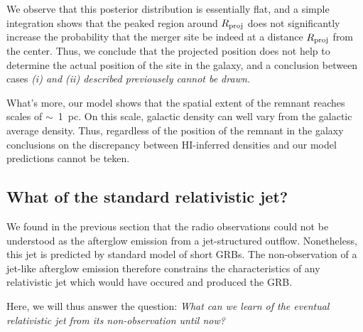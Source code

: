 
We observe that this posterior distribution is essentially flat, and a simple integration shows that the peaked region around $R_\rm{proj}$ does not significantly increase the probability that the merger site be indeed at a distance $R_\rm{proj}$ from the center. Thus, we conclude that the projected position does not help to determine the actual position of the site in the galaxy, and a conclusion between cases \it{(i)} and \it{(ii)} described previousely cannot be drawn.


What's more, our model shows that the spatial extent of the remnant reaches scales of $\sim$~1~pc. On this scale, galactic density can well vary from the galactic average density. Thus, regardless of the position of the remnant in the galaxy conclusions on the discrepancy between HI-inferred densities and our model predictions cannot be teken.



\subsection{What of the standard relativistic jet?}

We found in the previous section that the radio observations could not be understood as the afterglow emission from a jet-structured outflow. Nonetheless, this jet is predicted by standard model of short GRBs. The non-observation of a jet-like afterglow emission therefore constrains the characteristics of any relativistic jet which would have occured and produced the GRB.


Here, we will thus answer the question: \it{What can we learn of the eventual relativistic jet from its non-observation until now?}

